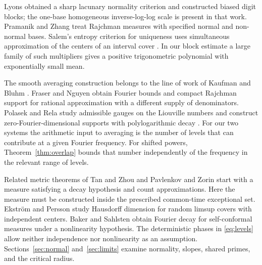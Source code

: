 \documentclass[11pt,a4paper,reqno]{amsart}
\theoremstyle{definition}
\theoremstyle{remark}
\numberwithin{equation}{section}
\begin{document}
Lyons \cite[Theorems~4--5 and Lemma~9]{Lyons} obtained a sharp
lacunary normality criterion and constructed biased digit blocks;
the one-base homogeneous inverse-log-log scale is present in that
work. Pramanik and Zhang \cite{PZ} treat Rajchman measures with
specified normal and non-normal bases. Salem's entropy criterion for
uniqueness uses simultaneous approximation of the centers of an
interval cover \cite[Ch.~VII, \S8]{Kahane}. In our block estimate a
large family of such multipliers gives a positive trigonometric
polynomial with exponentially small mean.

The smooth averaging construction belongs to the line of work of
Kaufman \cite{Kaufman} and Bluhm \cite{Bluhm}. Fraser and Nguyen
\cite[Theorems~2.1 and 2.6]{FN} obtain Fourier bounds and compact
Rajchman support for rational approximation with a different supply of
denominators. Polasek and Rela study admissible gauges on the
Liouville numbers and construct zero-Fourier-dimensional supports
with polylogarithmic decay \cite{PR,PR2}. For our two systems the
arithmetic input to averaging is the number of levels that can
contribute at a given Fourier frequency. For shifted powers,
Theorem~\ref{thm:overlap} bounds that number independently of the
frequency in the relevant range of levels.

Related metric theorems of Tan and Zhou \cite[Theorems~1.8 and~1.10]{TZ} and
Pavlenkov and Zorin \cite{PaZ} start with a measure satisfying a
decay hypothesis and count approximations. Here the measure must be
constructed inside the prescribed common-time exceptional set.
Ekstr\"om and Persson \cite{EP} study Hausdorff dimension for random
limsup covers with independent centers. Baker and Sahlsten
\cite{BS} obtain Fourier decay for self-conformal measures under a
nonlinearity hypothesis. The deterministic phases in
\eqref{eq:levels} allow neither independence nor nonlinearity as an
assumption. Sections~\ref{sec:normal} and~\ref{sec:limits} examine
normality, slopes, shared primes, and the critical radius.
\end{document}
